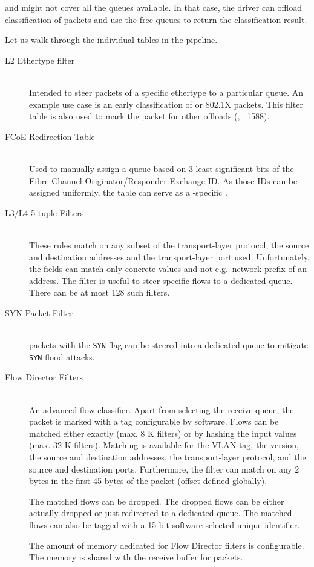  and  might not cover all the queues available. In that case,
the driver can offload classification of packets and use the free queues to
return the classification result.

Let us walk through the individual tables in the pipeline.
\begin{description}
	\item[L2 Ethertype filter] \hfill \\
		Intended to steer packets of a specific ethertype to
		a particular queue. An example use case is an early classification of
		 or  802.1X packets. This filter table is
		also used to mark the packet for other offloads (, ~1588).
	\item[FCoE Redirection Table] \hfill \\
		Used to manually assign a queue based on 3 least significant bits of
		the Fibre Channel Originator/Responder Exchange ID. As those IDs can be
		assigned uniformly, the table can serve as a -specific .
	\item[L3/L4 5-tuple Filters] \hfill \\
		These rules match on any subset of the transport-layer protocol, the source
		and destination  addresses and the transport-layer port used.
		Unfortunately, the fields can match only concrete values and not
		e.g.\ network prefix of an address. The filter is useful to steer specific
		flows to a dedicated queue. There can be at most 128 such filters.
	\item[SYN Packet Filter] \hfill \\
		 packets with the \texttt{SYN} flag can be steered into
		a dedicated queue to mitigate \texttt{SYN} flood attacks.
	\item[Flow Director Filters] \hfill \\
		\label{sec:82599-fdir}%
		An advanced flow classifier. Apart from selecting the receive queue,
		the packet is marked with a tag configurable by software. Flows can be
		matched either exactly (max. 8 K filters) or by hashing the input
		values (max. 32 K filters). Matching is available for the VLAN tag, the
		 version, the source and destination  addresses, the
		transport-layer protocol, and the source and destination ports.
		Furthermore, the filter can
		match on any 2 bytes in the first 45 bytes of the packet (offset
		defined globally).

		The matched flows can be dropped. The dropped flows can be either actually
		dropped or just redirected to a dedicated queue. The matched flows can also
		be tagged with a 15-bit software-selected unique identifier.

		The amount of memory dedicated for Flow Director filters is
		configurable. The memory is shared with the receive buffer for packets.
\end{description}

